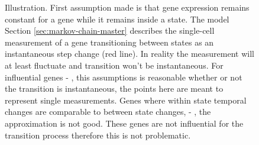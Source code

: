 \begin{figure}
  \centering
  \caption{
    Illustration. First assumption made is that gene expression remains constant for a gene while it remains inside a state. The model Section \ref{sec:markov-chain-master} describes the single-cell measurement of a gene transitioning between states as an instantaneous step change (red line). In reality the measurement will at least fluctuate and transition won't be instantaneous. For influential genes  - , this assumptions is reasonable whether or not the transition is instantaneous, the points here are meant to represent single measurements. Genes where within state temporal changes are comparable to between state changes,  - , the approximation is not good. These genes are not influential for the transition process therefore this is not problematic.
}
\end{figure}
